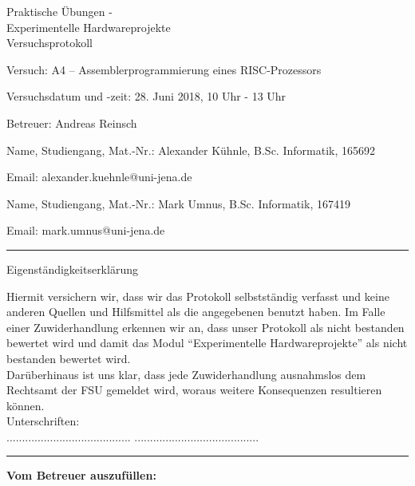 \documentclass[12pt,a4paper]{scrartcl}
\begin{document}
\thispagestyle{empty}

\begin{center}
  \LARGE
  Praktische \"Ubungen - \\
  Experimentelle Hardwareprojekte \\
  \bigskip
  \Large 
  Versuchsprotokoll
\end{center}

\vspace{1em}
Versuch: A4 -- Assemblerprogrammierung eines RISC-Prozessors

Versuchsdatum und -zeit: 28. Juni 2018, 10 Uhr - 13 Uhr

Betreuer: Andreas Reinsch 

\vspace{1em}
Name, Studiengang, Mat.-Nr.: Alexander K\"uhnle, B.Sc. Informatik, 165692

Email: alexander.kuehnle@uni-jena.de

\vspace{1em}
Name, Studiengang, Mat.-Nr.: Mark Umnus, B.Sc. Informatik, 167419

Email: mark.umnus@uni-jena.de

\vspace*{1cm}
\hrule
\vspace*{1cm}
{\Large  Eigenst\"andigkeitserkl\"arung }
 
Hiermit versichern wir, dass wir das Protokoll selbstst\"andig verfasst
und keine anderen Quellen und Hilfsmittel als die angegebenen benutzt 
haben. Im Falle einer Zuwiderhandlung erkennen wir an, dass unser Protokoll 
als nicht bestanden bewertet wird und damit das Modul ``Experimentelle 
Hardwareprojekte'' als nicht bestanden bewertet wird. \\
Dar\"uberhinaus ist uns klar, dass jede Zuwiderhandlung ausnahmslos dem 
Rechtsamt der FSU gemeldet wird, woraus weitere Konsequenzen resultieren 
k\"onnen. \\

Unterschriften: \\ 
\hspace*{4cm} ........................................ 
\hspace{2cm} ........................................  \\

\hrule

\vspace*{0.3cm}
\textbf{Vom Betreuer auszuf\"ullen:}
\end{document}
